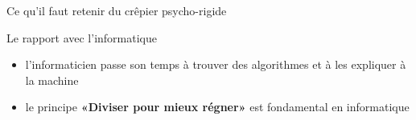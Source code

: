 \documentclass[final,hyperref={pdfpagelabels=false}]{beamer}
\renewenvironment{Coupe}{   }{   }
\renewcommand*{\tiny}{\fontsize{\resulttinyX}{\resulttinyY}\selectfont}
\renewcommand*{\footnotesize}{\fontsize{\resultfootnotesizeX}{\resultfootnotesizeY}\selectfont}
\begin{document}
\begin{Coupe}
\begin{frame}{Ce qu'il faut retenir du  crêpier psycho-rigide}
  \begin{block}{Le rapport avec l'informatique}
    \begin{itemize}
    \item l'informaticien passe son temps à trouver des algorithmes et  à les
    expliquer à la machine
    \item le principe \alert{\textbf{«Diviser pour mieux régner»}} est
    fondamental en informatique
    \end{itemize}
  \end{block}
\end{frame}
\newcommand{\maisonPair}[5]{  \begin{tikzpicture}
    \node[name=m,shape=regular polygon,regular polygon sides=#3,minimum size=22mm,
          rotate=(360/#3)]{};
    \node[name=b,shape=regular polygon,regular polygon sides=#4,minimum size=14mm,
          rotate=(360/#4)/2]{};
    \foreach \base/\maison in {#5} {
      \draw[shift=(m.corner \base)]
         node[shape=ellipse,fill=\maison,draw=black,rotate=((360/#3)*(\base-1))+(360/#3/2)] {~~};
    }
    \foreach \bb in {1,...,#4} {
      \draw[shift=(b.corner \bb)] node[name=bb \bb]{};
    }
    \foreach \base/\maison in {#1} {
      \draw[shift=(b.corner \base)]
         node[name=bb \base,shape=circle,fill=\maison,draw=black,inner sep=.1]
         {~~~};
    }
    #2
  \end{tikzpicture}
}
\newcommand{\maisonImpair}[5]{  \begin{tikzpicture}
    \node[name=m,shape=regular polygon,regular polygon sides=#3,
          minimum size=22mm, inner sep=0pt]{};
    \node[name=b,shape=regular polygon,regular polygon sides=#4,minimum size=14mm]{};
    \foreach \base/\maison in {#5} {
      \draw[shift=(m.corner \base)]
         node[shape=ellipse,fill=\maison,draw=black,rotate=(360/#3)*(\base-1)] {~~};
    }
    \foreach \base/\maison in {#1} {
      \draw[shift=(b.corner \base)]
         node[shape=circle,fill=\maison,draw=black,inner sep=.1] {~~~};
    }
    \foreach \bb in {1,...,#4} {\draw[shift=(b.corner \bb)] node[name=bb \bb] {};}
    #2
  \end{tikzpicture}
}


\end{Coupe}
\end{document}
